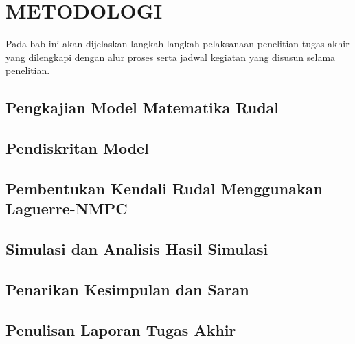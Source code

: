 \pagebreak
\chapter{METODOLOGI}

Pada bab ini akan dijelaskan langkah-langkah pelaksanaan penelitian tugas akhir yang dilengkapi dengan alur proses serta jadwal kegiatan yang disusun selama penelitian.

\section{Pengkajian Model Matematika Rudal}

\section{Pendiskritan Model}

\section{Pembentukan Kendali Rudal Menggunakan Laguerre-NMPC}

\section{Simulasi dan Analisis Hasil Simulasi}

\section{Penarikan Kesimpulan dan Saran}

\section{Penulisan Laporan Tugas Akhir}

